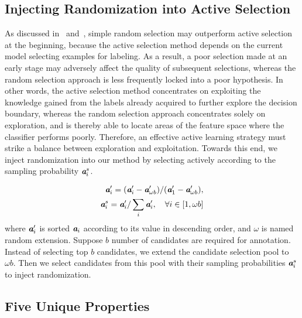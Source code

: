 \subsection{Injecting Randomization into Active Selection}
\label{ch3:approach_property:injecting_randomization_active_selection}

As discussed in~\citet{borisov2010active} and~\citet{zhou2017fine}, simple random selection may outperform active selection at the beginning, because the active selection method depends on the current model selecting examples for labeling. As a result, a poor selection made at an early stage may adversely affect the quality of subsequent selections, whereas the random selection approach is less frequently locked into a poor hypothesis. In other words, the active selection method concentrates on exploiting the knowledge gained from the labels already acquired to further explore the decision boundary, whereas the random selection approach concentrates solely on exploration, and is thereby able to locate areas of the feature space where the classifier performs poorly. Therefore, an effective active learning strategy must strike a balance between exploration and exploitation.
Towards this end, we inject randomization into our method by selecting actively according to the sampling probability $\textbf{\em a}^{s}_i$.

\begin{equation}
\label{eq:randomness}
\begin{split}
\textbf{\em a}'_i=(\textbf{\em a}'_i-\textbf{\em a}'_{\omega b})/(\textbf{\em a}'_1-\textbf{\em a}'_{\omega b}), \\
 \textbf{\em a}^{s}_i=\textbf{\em a}'_i/\sum_i{\textbf{\em a}'_i},\quad \forall i \in [1,\omega b]
\end{split}
\end{equation}
where $\textbf{\em a}'_i$ is sorted $\textbf{\em a}_i$ according to its value in descending order, and $\omega$ is named random extension.
Suppose $b$ number of candidates are required for annotation. Instead of selecting top $b$ candidates, we extend the candidate selection pool to $\omega b$. Then we select candidates from this pool with their sampling probabilities $\textbf{\em a}^{s}_i$ to inject randomization.


\subsection{Five Unique Properties}
\label{ch3:approach_property:several_unique_properties}


